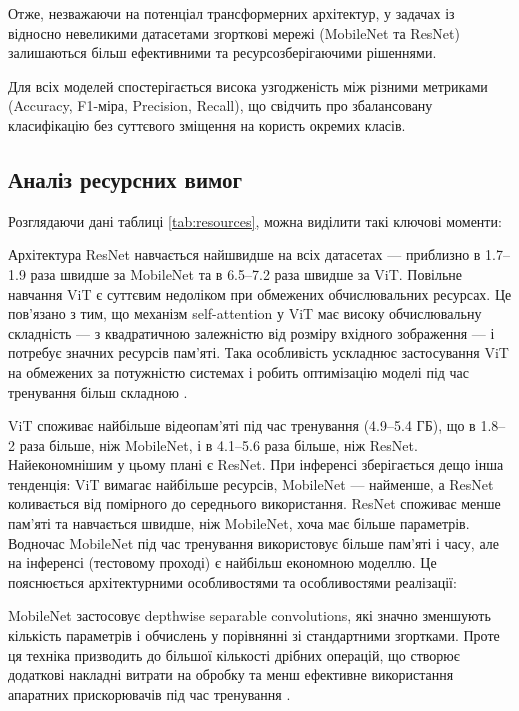 \documentclass[14pt,a4paper]{extarticle}
\begin{document}
Отже, незважаючи на потенціал трансформерних архітектур, у задачах із відносно невеликими датасетами згорткові мережі (MobileNet та ResNet) залишаються більш ефективними та ресурсозберігаючими рішеннями.

Для всіх моделей спостерігається висока узгодженість між різними метриками (Accuracy, F1-міра, Precision, Recall), що свідчить про збалансовану класифікацію без суттєвого зміщення на користь окремих класів.

\subsection{Аналіз ресурсних вимог}

Розглядаючи дані таблиці \ref{tab:resources}, можна виділити такі ключові моменти:

Архітектура ResNet навчається найшвидше на всіх датасетах — приблизно в 1.7–1.9 раза швидше за MobileNet та в 6.5–7.2 раза швидше за ViT. Повільне навчання ViT є суттєвим недоліком при обмежених обчислювальних ресурсах. Це пов’язано з тим, що механізм self-attention у ViT має високу обчислювальну складність — з квадратичною залежністю від розміру вхідного зображення — і потребує значних ресурсів пам’яті. Така особливість ускладнює застосування ViT на обмежених за потужністю системах і робить оптимізацію моделі під час тренування більш складною \cite{vaswani2017attention, dosovitskiy2020vit}.

ViT споживає найбільше відеопам’яті під час тренування (4.9–5.4 ГБ), що в 1.8–2 раза більше, ніж MobileNet, і в 4.1–5.6 раза більше, ніж ResNet. Найекономнішим у цьому плані є ResNet. При інференсі зберігається дещо інша тенденція: ViT вимагає найбільше ресурсів, MobileNet — найменше, а ResNet коливається від помірного до середнього використання. ResNet споживає менше пам’яті та навчається швидше, ніж MobileNet, хоча має більше параметрів. Водночас MobileNet під час тренування використовує більше пам’яті і часу, але на інференсі (тестовому проході) є найбільш економною моделлю. Це пояснюється архітектурними особливостями та особливостями реалізації:

MobileNet застосовує depthwise separable convolutions, які значно зменшують кількість параметрів і обчислень у порівнянні зі стандартними згортками. Проте ця техніка призводить до більшої кількості дрібних операцій, що створює додаткові накладні витрати на обробку та менш ефективне використання апаратних прискорювачів під час тренування \cite{howard2017mobilenets, sandler2018mobilenetv2}.
\end{document}
